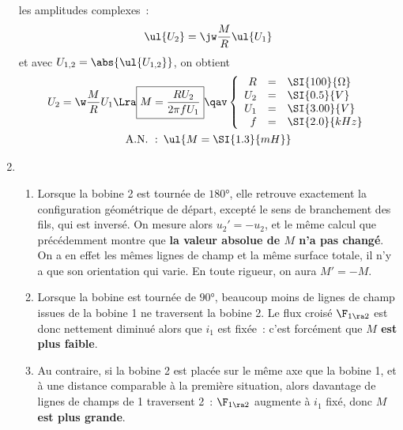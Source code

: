 \documentclass[a4paper, 10pt, final, garamond]{book}
\begin{document}
\begin{enumerate}
	      les amplitudes complexes~:
	      \[
		      \ul{U_2} = \jw \frac{M}{R} \ul{U_1}
	      \]
	      et avec $U_{1,2} = \abs{\ul{U_{1,2}}}$, on obtient
	      \begin{gather*}
		      U_2 = \w \frac{M}{R} U_1
		      \Lra
		      \boxed{M = \frac{RU_2}{2\pi fU_1}}
		      \qav
		      \left\{
		      \begin{array}{rcl}
			      R   & = & \SI{100}{\Omega}
			      \\
			      U_2 & = & \SI{0.5}{V}
			      \\
			      U_1 & = & \SI{3.00}{V}
			      \\
			      f   & = & \SI{2.0}{kHz}
		      \end{array}
		      \right.
		      \\
		      \mathrm{A.N.~:}\enskip
		      \ul{
			      M = \SI{1.3}{mH}
		      }
	      \end{gather*}
	\item
	      \begin{enumerate}
		      \item Lorsque la bobine 2 est tournée de $\ang{180}$, elle retrouve
		            exactement la configuration géométrique de départ, excepté le
		            sens de branchement des fils, qui est inversé. On mesure alors
		            $u_2' = -u_2$, et le même calcul que précédemment montre que
		            \textbf{la valeur absolue de $M$ n'a pas changé}. On a en effet
		            les mêmes lignes de champ et la même surface totale, il n'y a
		            que son orientation qui varie. En toute rigueur, on aura $M' =
			            -M$.
		      \item Lorsque la bobine est tournée de $\ang{90}$, beaucoup moins de
		            lignes de champ issues de la bobine 1 ne traversent la bobine 2.
		            Le flux croisé $\F_{1 \ra 2}$ est donc nettement diminué alors
		            que $i_1$ est fixée~: c'est forcément que \textbf{$M$ est plus
			            faible}.
		      \item Au contraire, si la bobine 2 est placée sur le même axe que la
		            bobine 1, et à une distance comparable à la première situation,
		            alors davantage de lignes de champs de 1 traversent 2~: $\F_{1
				            \ra 2}$ augmente à $i_1$ fixé, donc \textbf{$M$ est plus
			            grande}.
	      \end{enumerate}
\end{enumerate}
\end{document}
